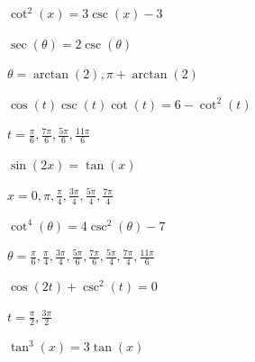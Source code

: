 \documentclass{ximera}
\begin{document}
\begin{question}
\begin{problem}
$\cot^{2}(x) = 3\csc(x) - 3$

\begin{selectAll}
  \end{selectAll}
\end{problem}

\begin{problem}
$\sec(\theta) = 2\csc(\theta)$

\begin{solution}
$\theta=\arctan(2), \pi + \arctan(2)$ 
\end{solution}
\end{problem}

\begin{problem}
$\cos(t) \csc(t)\cot(t) = 6-\cot^{2}(t)$

\begin{solution}
$t = \frac{\pi}{6}, \frac{7\pi}{6}, \frac{5\pi}{6}, \frac{11\pi}{6}$
\end{solution}
\end{problem}

\begin{problem}
$\sin(2x) = \tan(x)$

\begin{solution}
$x = 0, \pi, \frac{\pi}{4}, \frac{3\pi}{4}, \frac{5\pi}{4}, \frac{7\pi}{4}$
\end{solution}
\end{problem}

\begin{problem}
$\cot^{4}(\theta) = 4\csc^{2}(\theta) - 7$

\begin{solution}
$\theta = \frac{\pi}{6}, \frac{\pi}{4}, \frac{3\pi}{4}, \frac{5\pi}{6}, \frac{7\pi}{6}, \frac{5\pi}{4}, \frac{7\pi}{4}, \frac{11\pi}{6}$
\end{solution}
\end{problem}

\begin{problem}
 $\cos(2t) + \csc^{2}(t) = 0$

\begin{solution}
$t = \frac{\pi}{2}, \frac{3\pi}{2}$
\end{solution}
\end{problem}

\begin{problem}
$\tan^{3} \left( x \right) = 3\tan \left( x \right)$


\end{problem}
\end{question}
\end{document}

